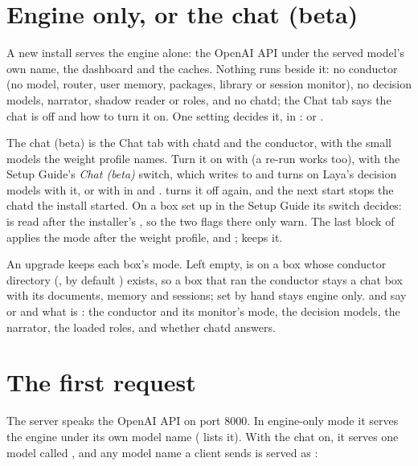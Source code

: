 \section{Engine only, or the chat (beta)}\label{sec:mode}

A new install serves the engine alone: the OpenAI API under the served model's own name, the dashboard and the caches. Nothing runs beside it: no conductor (no  model, router, user memory, packages, library or session monitor), no decision models, narrator, shadow reader or roles, and no chatd; the Chat tab says the chat is off and how to turn it on. One setting decides it,  in :  or .

The chat (beta) is the Chat tab with chatd and the conductor, with the small models the weight profile names. Turn it on with  (a re-run works too), with the Setup Guide's \emph{Chat (beta)} switch, which writes  to  and turns on Laya's decision models with it, or with  in  and .  turns it off again, and the next start stops the chatd the install started. On a box set up in the Setup Guide its switch decides:  is read after the installer's , so the two flags there only warn. The last block of  applies the mode after the weight profile,  and ;  keeps it.

An upgrade keeps each box's mode. Left empty,  is  on a box whose conductor directory (, by default ) exists, so a box that ran the conductor stays a chat box with its documents, memory and sessions;  set by hand stays engine only.  and  say  or  and what is : the conductor and its monitor's mode, the decision models, the narrator, the loaded roles, and whether chatd answers.

\section{The first request}

The server speaks the OpenAI API on port 8000. In engine-only mode it serves the engine under its own model name ( lists it). With the chat on, it serves one model called , and any model name a client sends is served as :

